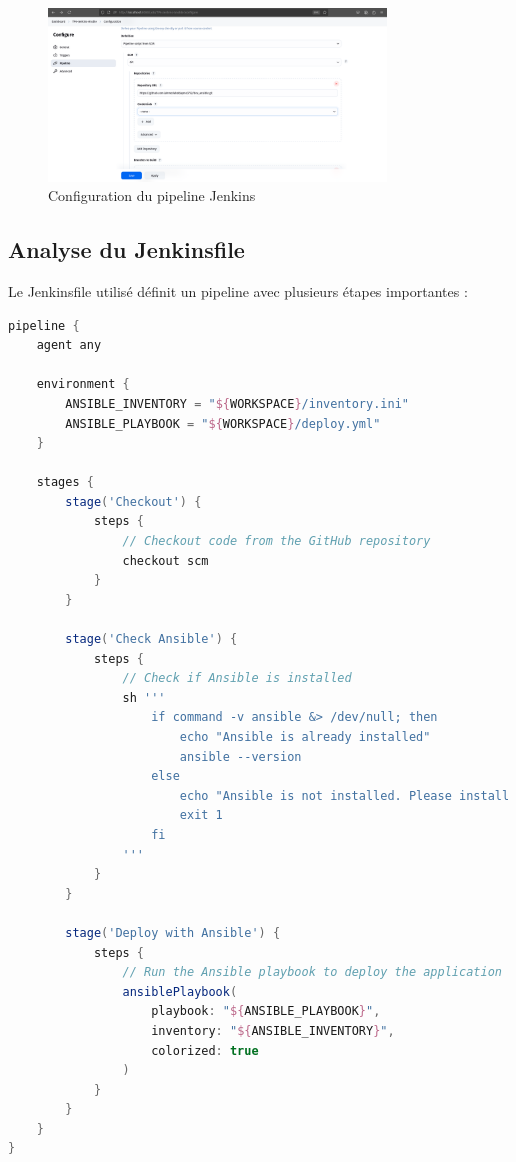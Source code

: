 \documentclass{article}
\begin{document}
\begin{figure}[h]
    \centering
    \includegraphics[width=0.8\textwidth]{images/jenkins_pipeline_config.png}
    \caption{Configuration du pipeline Jenkins}
    \label{fig:jenkins_pipeline_config}
\end{figure}

\subsection{Analyse du Jenkinsfile}

Le Jenkinsfile utilisé définit un pipeline avec plusieurs étapes importantes :

\begin{lstlisting}[language=groovy]
pipeline {
    agent any
    
    environment {
        ANSIBLE_INVENTORY = "${WORKSPACE}/inventory.ini"
        ANSIBLE_PLAYBOOK = "${WORKSPACE}/deploy.yml"
    }
    
    stages {
        stage('Checkout') {
            steps {
                // Checkout code from the GitHub repository
                checkout scm
            }
        }
        
        stage('Check Ansible') {
            steps {
                // Check if Ansible is installed
                sh '''
                    if command -v ansible &> /dev/null; then
                        echo "Ansible is already installed"
                        ansible --version
                    else
                        echo "Ansible is not installed. Please install it before running this pipeline."
                        exit 1
                    fi
                '''
            }
        }
        
        stage('Deploy with Ansible') {
            steps {
                // Run the Ansible playbook to deploy the application
                ansiblePlaybook(
                    playbook: "${ANSIBLE_PLAYBOOK}",
                    inventory: "${ANSIBLE_INVENTORY}",
                    colorized: true
                )
            }
        }
    }
}
\end{lstlisting}
\end{document}
